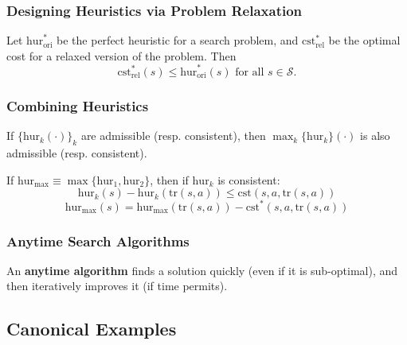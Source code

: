 \subsubsection{Designing Heuristics via Problem Relaxation}
\begin{definition}
    Let $\text{hur}^*_{\text{ori}}$ be the perfect heuristic for a search problem, and $\text{cst}^*_{\text{rel}}$ be the optimal cost for a relaxed version of the problem. Then
    \[
    \text{cst}^*_{\text{rel}}(s) \leq \text{hur}^*_{\text{ori}}(s) \text{ for all } s \in \mathcal{S}.
    \]
\end{definition}

\subsubsection{Combining Heuristics}
\begin{definition}
    If $\{ \text{hur}_k(\cdot) \}_k$ are admissible (resp. consistent), then $\max_k \{\text{hur}_k\} (\cdot)$ is also admissible (resp. consistent).
\end{definition}

\begin{definition}
    If $\text{hur}_{\max} \equiv \max \{\text{hur}_1, \text{hur}_2\}$, then if $\text{hur}_k$ is consistent:
    \[
    \text{hur}_k(s) - \text{hur}_k(\text{tr}(s,a)) \leq \text{cst}(s,a,\text{tr}(s,a))
    \]
    \[
    \text{hur}_{\max} (s)= \text{hur}_{\max}(\text{tr}(s,a)) - \text{cst}^*(s,a,\text{tr}(s,a))
    \]
\end{definition}

\subsubsection{Anytime Search Algorithms}
\begin{definition}
    An \textbf{anytime algorithm} finds a solution quickly (even if it is sub-optimal), and then iteratively improves it (if time permits).
\end{definition}
\newpage

\subsection{Canonical Examples}
